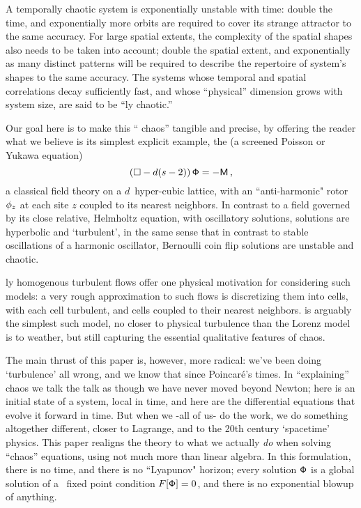 

\bigskip

\noindent
A temporally chaotic system is exponentially unstable with time: double the
time, and exponentially more orbits are required to cover its strange
attractor to the same accuracy. For large spatial extents, the complexity of
the spatial shapes also needs to be taken into account; double the spatial
extent, and exponentially as many distinct
{\spt} patterns will be required to describe the repertoire of
system's shapes to the same accuracy.
The systems whose temporal and spatial correlations decay sufficiently fast,
and whose ``physical'' dimension grows with
system size, are said to be ``{\spt}ly chaotic.''

Our goal here is to make this ``{\spt} chaos'' tangible and precise, by
offering the reader what we believe is its simplest explicit
example, the {\em \catlatt}
(a screened Poisson or Yukawa equation)
\[
 (\Box -d(s-2))\,\mathsf{\Phi}  =  -\mathsf{M}
 \,,
\]
a classical field theory on a $d$\dmn\ hyper-cubic lattice, with an
``anti-harmonic" rotor $\phi_{z}$ at each site $z$ coupled to its nearest
neighbors.
In contrast to a field governed by its close relative, Helmholtz equation, with
oscillatory solutions, {\catlatt} solutions are hyperbolic and
`turbulent', in the same sense that in contrast to stable oscillations of
a harmonic oscillator, Bernoulli coin flip solutions are unstable and
chaotic.

{\Spt}ly homogenous turbulent flows offer one physical motivation for
considering such models: a very rough approximation to such flows is
discretizing them into {\spt} cells, with each cell turbulent, and cells
coupled to their nearest neighbors.  {\catLatt} is arguably the simplest
such model, no closer to physical turbulence than the Lorenz
model is to weather, but still capturing the essential
qualitative features of {\spt} chaos.

The main thrust of this paper is, however, more radical: we've been doing
`turbulence' all wrong, and we know that since Poincar{\'e}'s times. In
``explaining'' chaos we talk the talk as though we have never moved
beyond Newton; here is an initial state of a system, local in time, and
here are the differential equations that evolve it forward in time. But
when we -all of us- do the work, we do something altogether different,
closer to Lagrange, and to the 20th century `spacetime' physics. This
paper realigns the theory to what we actually {\em do} when solving
``chaos'' equations, using not much more than linear algebra. In this
formulation, there is no time, and there is no ``Lyapunov" horizon; every
solution $\mathsf{\Phi}$ is a global solution of a \spt\ fixed point condition
$F[\mathsf{\Phi}]=0$, and there is no exponential blowup of anything.

